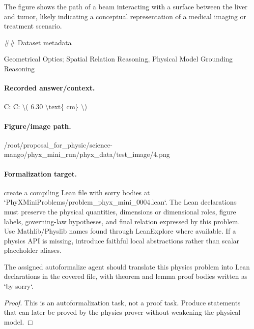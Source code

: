 The figure shows the path of a beam interacting with a surface between the liver and tumor, likely indicating a conceptual representation of a medical imaging or treatment scenario.

\#\# Dataset metadata

Geometrical Optics; Spatial Relation Reasoning, Physical Model Grounding Reasoning

\paragraph{Recorded answer/context.}
C: C: \textbackslash{}( 6.30 \textbackslash{}text\{ cm\} \textbackslash{})

\paragraph{Figure/image path.}
/root/proposal\_for\_physic/science-mango/phyx\_mini\_run/phyx\_data/test\_image/4.png

\paragraph{Formalization target.}
create a compiling Lean file with sorry bodies at `PhyXMiniProblems/problem\_phyx\_mini\_0004.lean`. The Lean declarations must preserve the physical quantities, dimensions or dimensional roles, figure labels, governing-law hypotheses, and final relation expressed by this problem.
Use Mathlib/Physlib names found through LeanExplore where available. If a physics API is missing, introduce faithful local abstractions rather than scalar placeholder aliases.

\begin{theorem}
\label{thm:physics:phyx_mini_0004:target}
The assigned autoformalize agent should translate this physics problem into Lean declarations in the covered file, with theorem and lemma proof bodies written as `by sorry`.
\end{theorem}
\begin{proof}
This is an autoformalization task, not a proof task. Produce statements that can later be proved by the physics prover without weakening the physical model.
\end{proof}

